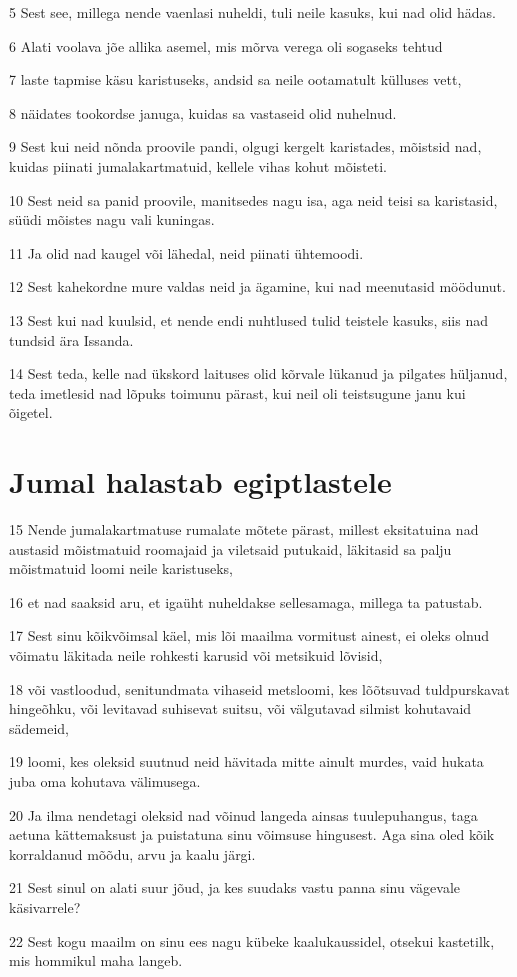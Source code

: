 \par 5 Sest see, millega nende vaenlasi nuheldi, tuli neile kasuks, kui nad olid hädas.
\par 6 Alati voolava jõe allika asemel, mis mõrva verega oli sogaseks tehtud
\par 7 laste tapmise käsu karistuseks, andsid sa neile ootamatult külluses vett,
\par 8 näidates tookordse januga, kuidas sa vastaseid olid nuhelnud.
\par 9 Sest kui neid nõnda proovile pandi, olgugi kergelt karistades, mõistsid nad, kuidas piinati jumalakartmatuid, kellele vihas kohut mõisteti.
\par 10 Sest neid sa panid proovile, manitsedes nagu isa, aga neid teisi sa karistasid, süüdi mõistes nagu vali kuningas.
\par 11 Ja olid nad kaugel või lähedal, neid piinati ühtemoodi.
\par 12 Sest kahekordne mure valdas neid ja ägamine, kui nad meenutasid möödunut.
\par 13 Sest kui nad kuulsid, et nende endi nuhtlused tulid teistele kasuks, siis nad tundsid ära Issanda.
\par 14 Sest teda, kelle nad ükskord laituses olid kõrvale lükanud ja pilgates hüljanud, teda imetlesid nad lõpuks toimunu pärast, kui neil oli teistsugune janu kui õigetel. 

\section*{Jumal halastab egiptlastele}

\par 15 Nende jumalakartmatuse rumalate mõtete pärast, millest eksitatuina nad austasid mõistmatuid roomajaid ja viletsaid putukaid, läkitasid sa palju mõistmatuid loomi neile karistuseks,
\par 16 et nad saaksid aru, et igaüht nuheldakse sellesamaga, millega ta patustab.
\par 17 Sest sinu kõikvõimsal käel, mis lõi maailma vormitust ainest, ei oleks olnud võimatu läkitada neile rohkesti karusid või metsikuid lõvisid,
\par 18 või vastloodud, senitundmata vihaseid metsloomi, kes lõõtsuvad tuldpurskavat hingeõhku, või levitavad suhisevat suitsu, või välgutavad silmist kohutavaid sädemeid,
\par 19 loomi, kes oleksid suutnud neid hävitada mitte ainult murdes, vaid hukata juba oma kohutava välimusega.
\par 20 Ja ilma nendetagi oleksid nad võinud langeda ainsas tuulepuhangus, taga aetuna kättemaksust ja puistatuna sinu võimsuse hingusest. Aga sina oled kõik korraldanud mõõdu, arvu ja kaalu järgi.
\par 21 Sest sinul on alati suur jõud, ja kes suudaks vastu panna sinu vägevale käsivarrele?
\par 22 Sest kogu maailm on sinu ees nagu kübeke kaalukaussidel, otsekui kastetilk, mis hommikul maha langeb. 

